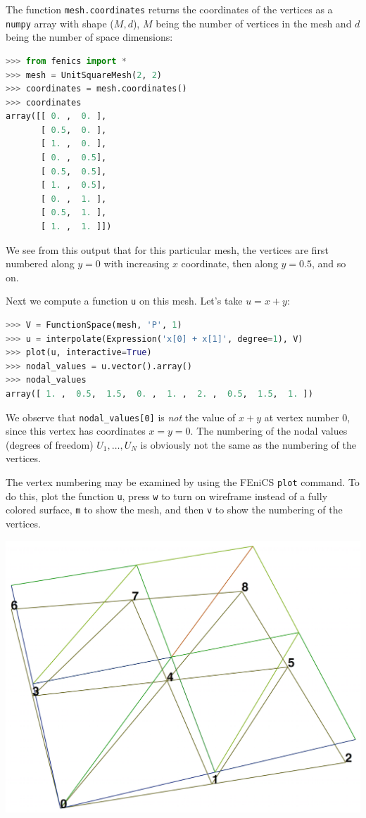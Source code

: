 \documentclass[graybox,envcountchap,sectrefs,final]{svmonodo}
\begin{document}
The function \texttt{mesh.coordinates} returns the coordinates of the
vertices as a \texttt{numpy} array with shape ($M,d$), $M$ being the number
of vertices in the mesh and $d$ being the number of space dimensions:

\begin{lstlisting}[language=Python,style=graycolor]
>>> from fenics import *
>>> mesh = UnitSquareMesh(2, 2)
>>> coordinates = mesh.coordinates()
>>> coordinates
array([[ 0. ,  0. ],
       [ 0.5,  0. ],
       [ 1. ,  0. ],
       [ 0. ,  0.5],
       [ 0.5,  0.5],
       [ 1. ,  0.5],
       [ 0. ,  1. ],
       [ 0.5,  1. ],
       [ 1. ,  1. ]])
\end{lstlisting}
We see from this output that for this particular mesh, the vertices
are first numbered along $y=0$
with increasing $x$ coordinate, then along $y=0.5$, and so on.

Next we compute a function \texttt{u} on this mesh. Let's take $u=x+y$:

\begin{lstlisting}[language=Python,style=graycolor]
>>> V = FunctionSpace(mesh, 'P', 1)
>>> u = interpolate(Expression('x[0] + x[1]', degree=1), V)
>>> plot(u, interactive=True)
>>> nodal_values = u.vector().array()
>>> nodal_values
array([ 1. ,  0.5,  1.5,  0. ,  1. ,  2. ,  0.5,  1.5,  1. ])
\end{lstlisting}
We observe that \Verb!nodal_values[0]! is \emph{not} the value of $x+y$ at
vertex number 0, since this vertex has coordinates $x=y=0$. The
numbering of the nodal values (degrees of freedom) $U_1,\ldots,U_{N}$
is obviously not the same as the numbering of the vertices.

The vertex numbering may be examined by using the FEniCS \texttt{plot}
command. To do this, plot the function \texttt{u}, press \texttt{w} to turn on
wireframe instead of a fully colored surface, \texttt{m} to show the mesh,
and then \texttt{v} to show the numbering of the vertices.



\vspace{6mm}

\centerline{\includegraphics[width=0.75\linewidth]{fig/vertex_numbering.png}}
\end{document}
